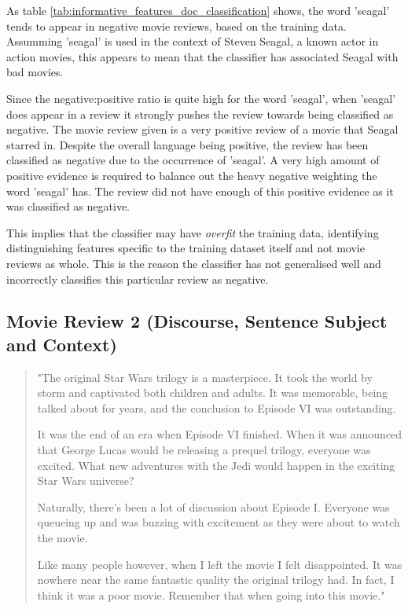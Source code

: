 \documentclass{article}
\begin{document}
As table \ref{tab:informative_features_doc_classification} shows, the word 'seagal' tends to appear in negative movie reviews, based on the training data. Assumming 'seagal' is used in the context of Steven Seagal, a known actor in action movies, this appears to mean that the classifier has associated Seagal with bad movies.

Since the negative:positive ratio is quite high for the word 'seagal', when 'seagal' does appear in a review it strongly pushes the review towards being classified as negative. The movie review given is a very positive review of a movie that Seagal starred in. Despite the overall language being positive, the review has been classified as negative due to the occurrence of 'seagal'. A very high amount of positive evidence is required to balance out the heavy negative weighting the word 'seagal' has. The review did not have enough of this positive evidence as it was classified as negative.

This implies that the classifier may have \textit{overfit} the training data, identifying distinguishing features specific to the training dataset itself and not movie reviews as whole. This is the reason the classifier has not generalised well and incorrectly classifies this particular review as negative.

\subsection{Movie Review 2 (Discourse, Sentence Subject and Context)}

\begin{quote}
"The original Star Wars trilogy is a masterpiece. It took the world by storm and captivated both children and adults. It was memorable, being talked about for years, and the conclusion to Episode VI was outstanding.

It was the end of an era when Episode VI finished. When it was announced that George Lucas would be releasing a prequel trilogy, everyone was excited. What new adventures with the Jedi would happen in the exciting Star Wars universe?

Naturally, there's been a lot of discussion about Episode I. Everyone was queueing up and was buzzing with excitement as they were about to watch the movie.

Like many people however, when I left the movie I felt disappointed. It was nowhere near the same fantastic quality the original trilogy had. In fact, I think it was a poor movie. Remember that when going into this movie."
\end{quote}
\end{document}
